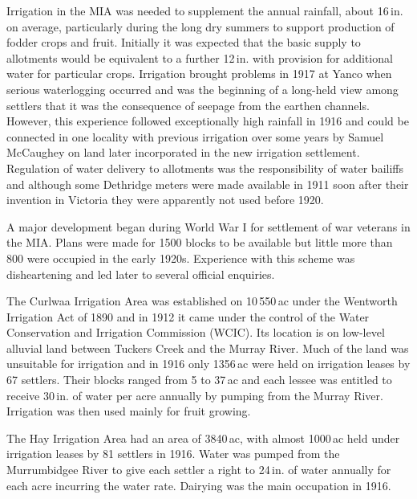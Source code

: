 Irrigation in the MIA was needed to supplement the annual rainfall,
about 16\,in. on average, particularly during the long dry summers to
support production of fodder crops and fruit.  Initially it was
expected that the basic supply to allotments would be equivalent to a
further 12\,in. with provision for additional water for particular
crops.  Irrigation
brought problems in 1917 at Yanco when serious waterlogging occurred
and was the beginning of a long-held view among settlers that it was
the consequence of seepage from the earthen channels.  However, this
experience followed exceptionally high rainfall in 1916 and could be
connected in one locality with previous irrigation over some years by
Samuel McCaughey on land later incorporated in the new irrigation
settlement.  Regulation of water delivery to allotments
was the responsibility of water bailiffs and although some Dethridge
meters were made available in 1911 soon after their invention in
Victoria they were apparently not used before 1920.

A major development began during World War I for settlement of war
veterans in the MIA.  Plans were made for 1500 blocks to be available
but little more than 800 were occupied in the early 1920s.  Experience
with this scheme was disheartening and led later to several official
enquiries.

The Curlwaa Irrigation Area was established on 10\,550\,ac under the
Wentworth Irrigation Act of 1890 and in 1912 it came under the control
of the Water Conservation and Irrigation Commission (WCIC).  Its location is on low-level alluvial land between
Tuckers Creek and the Murray River. Much of the land was unsuitable
for irrigation and in 1916 only 1356\,ac were held on irrigation
leases by 67 settlers.  Their blocks ranged from 5 to 37\,ac and each
lessee was entitled to receive 30\,in. of water per acre annually by
pumping from the Murray River.  Irrigation was then used mainly for
fruit growing.

The Hay Irrigation Area had an area of 3840\,ac, with almost 1000\,ac
held under irrigation leases by 81 settlers in 1916. Water was pumped
from the Murrumbidgee River to give each settler a right to 24\,in. of
water annually for each acre incurring the water rate.  Dairying was
the main occupation in 1916.

